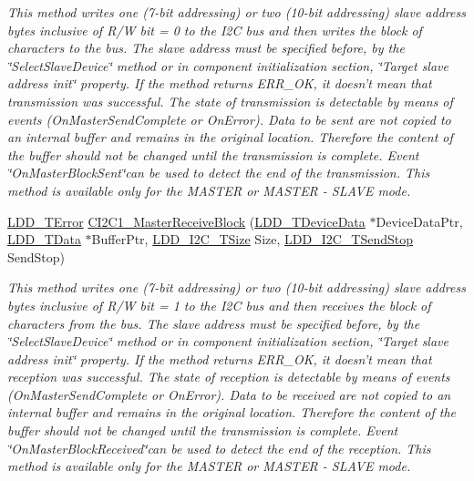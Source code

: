 \begin{DoxyCompactItemize}
\begin{DoxyCompactList}\small\item\em This method writes one (7-\/bit addressing) or two (10-\/bit addressing) slave address bytes inclusive of R/\-W bit = 0 to the I2\-C bus and then writes the block of characters to the bus. The slave address must be specified before, by the \char`\"{}\-Select\-Slave\-Device\char`\"{} method or in component initialization section, \char`\"{}\-Target slave address init\char`\"{} property. If the method returns E\-R\-R\-\_\-\-O\-K, it doesn't mean that transmission was successful. The state of transmission is detectable by means of events (On\-Master\-Send\-Complete or On\-Error). Data to be sent are not copied to an internal buffer and remains in the original location. Therefore the content of the buffer should not be changed until the transmission is complete. Event \char`\"{}\-On\-Master\-Block\-Sent\char`\"{}can be used to detect the end of the transmission. This method is available only for the M\-A\-S\-T\-E\-R or M\-A\-S\-T\-E\-R -\/ S\-L\-A\-V\-E mode. \end{DoxyCompactList}\item 
\hyperlink{group___p_e___types__module_ga24c2b045fd04e79e85f261ce4df35588}{L\-D\-D\-\_\-\-T\-Error} \hyperlink{group___c_i2_c1__module_ga361e50c9c40b74cdd1d37f9729d1e4dd}{C\-I2\-C1\-\_\-\-Master\-Receive\-Block} (\hyperlink{group___p_e___types__module_gac5cf1362f1f0e3a2ce71b1bf2276d091}{L\-D\-D\-\_\-\-T\-Device\-Data} $\ast$Device\-Data\-Ptr, \hyperlink{group___p_e___types__module_gade8ef9401405bd941b6da738b807f980}{L\-D\-D\-\_\-\-T\-Data} $\ast$Buffer\-Ptr, \hyperlink{group___p_e___types__module_gaa7fd2bc3f1f93e051058f9e70349c2b9}{L\-D\-D\-\_\-\-I2\-C\-\_\-\-T\-Size} Size, \hyperlink{group___p_e___types__module_gacac4ade6fbcd28c9ddcd864242063ec8}{L\-D\-D\-\_\-\-I2\-C\-\_\-\-T\-Send\-Stop} Send\-Stop)
\begin{DoxyCompactList}\small\item\em This method writes one (7-\/bit addressing) or two (10-\/bit addressing) slave address bytes inclusive of R/\-W bit = 1 to the I2\-C bus and then receives the block of characters from the bus. The slave address must be specified before, by the \char`\"{}\-Select\-Slave\-Device\char`\"{} method or in component initialization section, \char`\"{}\-Target slave address init\char`\"{} property. If the method returns E\-R\-R\-\_\-\-O\-K, it doesn't mean that reception was successful. The state of reception is detectable by means of events (On\-Master\-Send\-Complete or On\-Error). Data to be received are not copied to an internal buffer and remains in the original location. Therefore the content of the buffer should not be changed until the transmission is complete. Event \char`\"{}\-On\-Master\-Block\-Received\char`\"{}can be used to detect the end of the reception. This method is available only for the M\-A\-S\-T\-E\-R or M\-A\-S\-T\-E\-R -\/ S\-L\-A\-V\-E mode. \end{DoxyCompactList}\item 

\end{DoxyCompactItemize}
